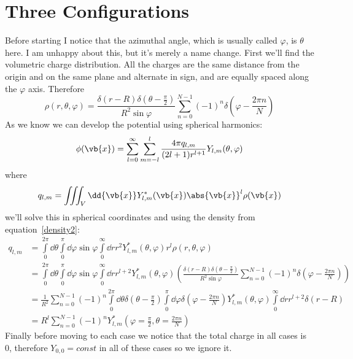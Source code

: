 \clearpage
\section{Three Configurations}
Before starting I notice that the azimuthal angle, which is usually called \(\varphi\), is \(\theta\) here. I am unhappy about this, but it's merely a name change. First we'll find the volumetric charge distribution. All the charges are the same distance from the origin and on the same plane and alternate in sign, and are equally spaced along the \(\varphi\) axis. Therefore
\begin{equation}\label{density2}
	\rho(r,\theta,\varphi)=\frac{\delta(r-R)\delta(\theta-\frac{\pi}{2})}{R^2\sin\varphi}\sum\limits_{n=0}^{N-1}{(-1)}^n\delta\left(\varphi-\frac{2\pi n}{N}\right)
\end{equation}
As we know we can develop the potential using spherical harmonics:
\begin{equation}
  \phi(\vb{x})=\sum_{l=0}^\infty\sum_{m=-l}^l\frac{4\pi q_{l,m}}{(2l+1)r^{l+1}}Y_{l,m}(\theta,\varphi)
\end{equation}
where
\begin{equation}
  q_{l,m}=\iiint_{V}\dd{\vb{x}}Y^*_{l,m}(\vb{x})\abs{\vb{x}}^l\rho(\vb{x})
\end{equation}
we'll solve this in spherical coordinates and using the density from equation~\ref{density2}:
\begin{align}
	q_{l,m}&=\int\limits_0^{2\pi}\dd\theta\int\limits_0^\pi\dd\varphi\sin\varphi\int\limits_0^\infty\dd r r^2Y^*_{l,m}(\theta,\varphi)r^l\rho(r,\theta,\varphi)\\
	&= \int\limits_0^{2\pi}\dd\theta\int\limits_0^\pi\dd\varphi\sin\varphi\int\limits_0^\infty\dd r r^{l+2}Y^*_{l,m}(\theta,\varphi)\left(\frac{\delta(r-R)\delta(\theta-\frac{\pi}{2})}{R^2\sin\varphi}\sum\limits_{n=0}^{N-1}{(-1)}^n\delta\left(\varphi-\frac{2\pi n}{N}\right)\right)\\
	&= \frac{1}{R^2}\sum\limits_{n=0}^{N-1}{(-1)}^n\int\limits_0^{2\pi}\dd\theta\delta(\theta-\frac{\pi}{2})\int\limits_0^\pi\dd\varphi\delta(\varphi-\frac{2\pi n}{N})Y^*_{l,m}(\theta,\varphi)\int\limits_0^\infty\dd rr^{l+2}\delta(r-R)\\
	&= R^l\sum\limits_{n=0}^{N-1}{(-1)}^n Y^*_{l,m}(\varphi=\frac{\pi}{2},\theta=\frac{2\pi n}{N})
\end{align}
Finally before moving to each case we notice that the total charge in all cases is 0, therefore \(Y_{0,0}=const\) in all of these cases so we ignore it.
